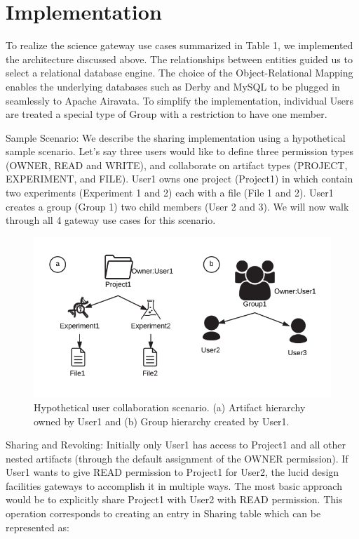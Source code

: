 \documentclass[sigconf]{acmart}
\begin{document}
\section{Implementation}
To realize the science gateway use cases summarized in Table 1, we implemented the architecture discussed above. The relationships between entities guided us to select a relational database engine. The choice of the Object-Relational Mapping enables the underlying databases such as Derby and MySQL to be plugged in seamlessly to Apache Airavata. To simplify the implementation, individual Users are treated a special type of Group with a restriction to have one member. 

Sample Scenario: We describe the sharing implementation using a hypothetical sample scenario. Let's say three users would like to define three permission types (OWNER, READ and WRITE), and collaborate on artifact types (PROJECT, EXPERIMENT, and FILE). User1 owns one project (Project1) in which contain two experiments (Experiment 1 and 2) each with a file (File 1 and 2). User1 creates a group (Group 1) two child members (User 2 and 3). We will now walk through all 4 gateway use cases for this scenario.

\begin{figure}
\includegraphics[width=\columnwidth]{figures/usage-scenarios.pdf}
\caption{Hypothetical user collaboration scenario. (a) Artifact hierarchy owned by User1 and (b) Group hierarchy created by User1.}
\end{figure}

Sharing and Revoking: Initially only User1 has access to Project1 and all other nested artifacts (through the default assignment of the OWNER permission). If User1 wants to give READ permission to Project1 for User2, the lucid design facilities gateways to accomplish it in multiple ways. The most basic approach would be to explicitly share Project1 with User2 with READ permission. This operation corresponds to creating an entry in Sharing table which can be represented as: 
\end{document}
